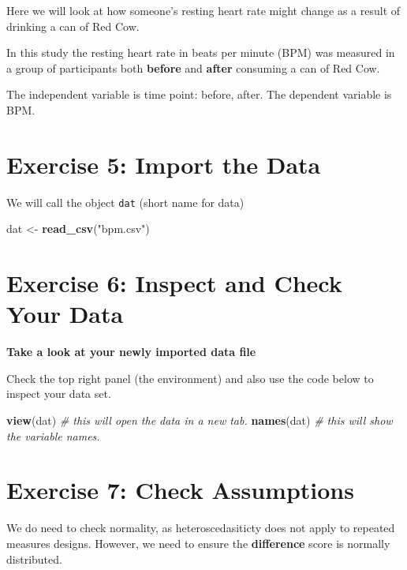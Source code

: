 \documentclass[
]{book}
\newenvironment{Shaded}{\begin{snugshade}}{\end{snugshade}}
\newcommand{\CommentTok}[1]{\textcolor[rgb]{0.56,0.35,0.01}{\textit{#1}}}
\newcommand{\FunctionTok}[1]{\textcolor[rgb]{0.13,0.29,0.53}{\textbf{#1}}}
\newcommand{\NormalTok}[1]{#1}
\newcommand{\OtherTok}[1]{\textcolor[rgb]{0.56,0.35,0.01}{#1}}
\newcommand{\StringTok}[1]{\textcolor[rgb]{0.31,0.60,0.02}{#1}}
\let\oldsection\section
\renewcommand{\section}{\needspace{5\baselineskip}\oldsection}
\begin{document}
Here we will look at how someone's resting heart rate might change as a result of drinking a can of Red Cow.

In this study the resting heart rate in beats per minute (BPM) was measured in a group of participants both \textbf{before} and \textbf{after} consuming a can of Red Cow.

The independent variable is time point: before, after. The dependent variable is BPM.

\section{Exercise 5: Import the Data}\label{exercise-5-import-the-data}

We will call the object \texttt{dat} (short name for data)

\begin{Shaded}
\begin{Highlighting}[]
\NormalTok{dat }\OtherTok{\textless{}{-}} \FunctionTok{read\_csv}\NormalTok{(}\StringTok{"bpm.csv"}\NormalTok{)}
\end{Highlighting}
\end{Shaded}

\section{Exercise 6: Inspect and Check Your Data}\label{exercise-6-inspect-and-check-your-data}

\textbf{Take a look at your newly imported data file}

Check the top right panel (the environment) and also use the code below to inspect your data set.

\begin{Shaded}
\begin{Highlighting}[]
\FunctionTok{view}\NormalTok{(dat) }\CommentTok{\# this will open the data in a new tab.}
\FunctionTok{names}\NormalTok{(dat) }\CommentTok{\# this will show the variable names.}
\end{Highlighting}
\end{Shaded}

\section{Exercise 7: Check Assumptions}\label{exercise-7-check-assumptions}

We do need to check normality, as heteroscedasiticty does not apply to repeated measures designs. However, we need to ensure the \textbf{difference} score is normally distributed.
\end{document}
